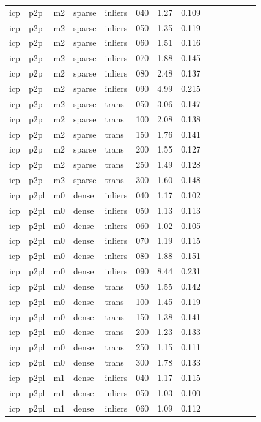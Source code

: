 \begin{table}[htbp]
\begin{tabular}{llllllrrrrrrrr}
  icp & p2p & m2 & sparse & inliers & 040 & 1.27 & 0.109 \\
  icp & p2p & m2 & sparse & inliers & 050 & 1.35 & 0.119 \\
  icp & p2p & m2 & sparse & inliers & 060 & 1.51 & 0.116 \\
  icp & p2p & m2 & sparse & inliers & 070 & 1.88 & 0.145 \\
  icp & p2p & m2 & sparse & inliers & 080 & 2.48 & 0.137 \\
  icp & p2p & m2 & sparse & inliers & 090 & 4.99 & 0.215 \\
  icp & p2p & m2 & sparse & trans & 050 & 3.06 & 0.147 \\
  icp & p2p & m2 & sparse & trans & 100 & 2.08 & 0.138 \\
  icp & p2p & m2 & sparse & trans & 150 & 1.76 & 0.141 \\
  icp & p2p & m2 & sparse & trans & 200 & 1.55 & 0.127 \\
  icp & p2p & m2 & sparse & trans & 250 & 1.49 & 0.128 \\
  icp & p2p & m2 & sparse & trans & 300 & 1.60 & 0.148 \\
  icp & p2pl & m0 & dense & inliers & 040 & 1.17 & 0.102 \\
  icp & p2pl & m0 & dense & inliers & 050 & 1.13 & 0.113 \\
  icp & p2pl & m0 & dense & inliers & 060 & 1.02 & 0.105 \\
  icp & p2pl & m0 & dense & inliers & 070 & 1.19 & 0.115 \\
  icp & p2pl & m0 & dense & inliers & 080 & 1.88 & 0.151 \\
  icp & p2pl & m0 & dense & inliers & 090 & 8.44 & 0.231 \\
  icp & p2pl & m0 & dense & trans & 050 & 1.55 & 0.142 \\
  icp & p2pl & m0 & dense & trans & 100 & 1.45 & 0.119 \\
  icp & p2pl & m0 & dense & trans & 150 & 1.38 & 0.141 \\
  icp & p2pl & m0 & dense & trans & 200 & 1.23 & 0.133 \\
  icp & p2pl & m0 & dense & trans & 250 & 1.15 & 0.111 \\
  icp & p2pl & m0 & dense & trans & 300 & 1.78 & 0.133 \\
  icp & p2pl & m1 & dense & inliers & 040 & 1.17 & 0.115 \\
  icp & p2pl & m1 & dense & inliers & 050 & 1.03 & 0.100 \\
  icp & p2pl & m1 & dense & inliers & 060 & 1.09 & 0.112 \\

\end{tabular}
\end{table}
